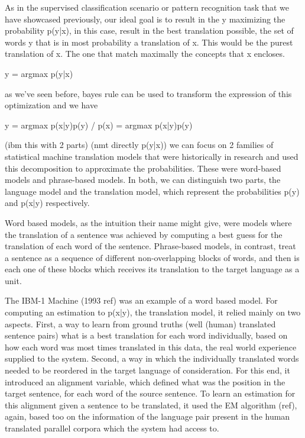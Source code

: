 \documentclass[11pt,english,listoffigures,listoftables]{tfgetsinf}
\begin{document}
As in the supervised classification scenario or pattern recognition task that we have showcased previously, our ideal goal is to result in the y maximizing the probability p(y|x), in this case, result in the best translation possible, the set of words y that is in most probability a translation of x. This would be the purest translation of x. The one that match maximally the concepts that x encloses. 

y = argmax p(y|x)

as we've seen before, bayes rule can be used to transform the expression of this optimization and we have

y = argmax p(x|y)p(y) / p(x) = argmax p(x|y)p(y)

(ibm this with 2 parts)
(nmt directly p(y|x))
we can focus on 2 families of statistical machine translation models that were historically in research and used this decomposition to approximate the probabilities.
These were word-based models and phrase-based models.
In both, we can distinguish two parts, the language model and the translation model, which represent the probabilities p(y) and p(x|y) respectively.

Word based models, as the intuition their name might give, were models where the translation of a sentence was achieved by computing a best guess for the translation of each word of the sentence.
Phrase-based models, in contrast, treat a sentence as a sequence of different non-overlapping blocks of words, and then is each one of these blocks which receives its translation to the target language as a unit.  

The IBM-1 Machine (1993 ref) was an example of a word based model. 
For computing an estimation to p(x|y), the translation model, it relied mainly on two aspects. First, a way to learn from ground truths (well (human) translated sentence pairs) what is a best translation for each word individually, based on how each word was most times translated in this data, the real world experience supplied to the system.
Second, a way in which the individually translated words needed to be reordered in the target language of consideration. For this end, it introduced an alignment variable, which defined what was the position in the target sentence, for each word of the source sentence. To learn an estimation for this alignment given a sentence to be translated, it used the EM algorithm (ref), again, based too on the information of the language pair present in the human translated parallel corpora which the system had access to.
\end{document}
